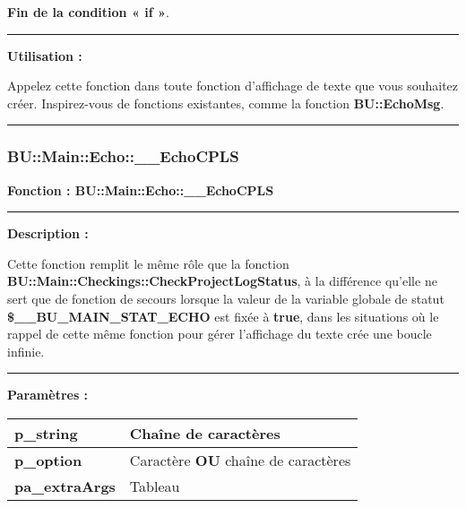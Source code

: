 \documentclass[a4paper,10pt]{article}
\begin{document}
\begin{justify}
    \textbf{\color{cond}Fin de la condition « if »}.
\end{justify}


\par\noindent\rule{\textwidth}{0.4pt}

\begin{justify}
    \textbf{Utilisation :}

    Appelez cette fonction dans toute fonction d'affichage de texte que vous souhaitez créer. Inspirez-vous de fonctions existantes, comme la fonction \textbf{\color{func}BU::EchoMsg}.
\end{justify}



\color{sec3}\par\noindent\rule{\textwidth}{0.4pt}\color{text}

\color{sec3}
\subsubsection{BU::Main::Echo::\_\_EchoCPLS}\color{text}

\begin{justify}
    \textbf{Fonction : \color{func}BU::Main::Echo::\_\_EchoCPLS}
\end{justify}


\par\noindent\rule{\textwidth}{0.4pt}

\begin{justify}
    \textbf{Description :}

    Cette fonction remplit le même rôle que la fonction \textbf{\color{func}BU::Main::Checkings::CheckProjectLogStatus}, à la différence qu'elle ne sert que de fonction de secours lorsque la valeur de la variable globale de statut \textbf{\color{vars}\$\_\_BU\_MAIN\_STAT\_ECHO} est fixée à \textbf{true}, dans les situations où le rappel de cette même fonction pour gérer l'affichage du texte crée une boucle infinie.
\end{justify}


\par\noindent\rule{\textwidth}{0.4pt}

\begin{justify}
    \textbf{Paramètres :}

    \begin{tabular}{|l|l|}
        \hline
        \textbf{\color{vars}p\_string} & Chaîne de caractères\\
        \hline
        \textbf{\color{vars}p\_option} & Caractère \textbf{OU} chaîne de caractères\\
        \hline
        \textbf{\color{vars}pa\_extraArgs} & Tableau\\
        \hline
    \end{tabular}
\end{justify}
\end{document}
